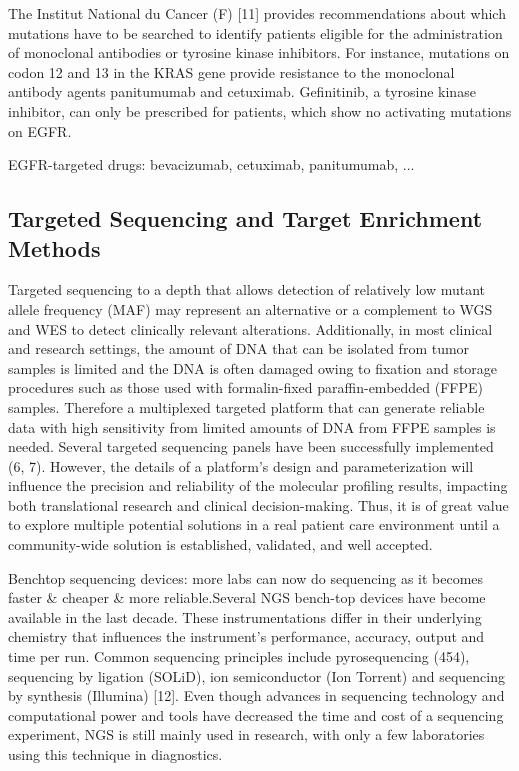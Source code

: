 The Institut National du Cancer (F) [11]
provides recommendations about which mutations have to be searched to identify
patients eligible for the administration of monoclonal antibodies or tyrosine
kinase inhibitors. For instance, mutations on codon 12 and 13 in the KRAS gene
provide resistance to the monoclonal antibody agents panitumumab and cetuximab.
Gefinitinib, a tyrosine kinase inhibitor, can only be prescribed for patients,
which show no activating mutations on EGFR.


EGFR-targeted drugs:
bevacizumab, cetuximab, panitumumab, ...

\subsection{Targeted Sequencing and Target Enrichment Methods}

Targeted sequencing to a depth that allows detection of relatively low mutant
allele frequency (MAF) may represent an alternative or a complement to WGS and
WES to detect clinically relevant alterations. Additionally, in most clinical
and research settings, the amount of DNA that can be isolated from tumor samples
is limited and the DNA is often damaged owing to fixation and storage procedures
such as those used with formalin-fixed paraffin-embedded (FFPE) samples.
Therefore a multiplexed targeted platform that can generate reliable data with
high sensitivity from limited amounts of DNA from FFPE samples is needed.
Several targeted sequencing panels have been successfully implemented (6, 7).
However, the details of a platform's design and parameterization will influence
the precision and reliability of the molecular profiling results, impacting both
translational research and clinical decision-making. Thus, it is of great value
to explore multiple potential solutions in a real patient care environment until
a community-wide solution is established, validated, and well accepted.

Benchtop sequencing devices: more labs can now do sequencing as it becomes
faster \& cheaper \& more reliable.Several NGS bench-top devices have become
available in the last decade. These instrumentations differ in their underlying
chemistry that influences the instrument’s performance, accuracy, output and
time per run. Common sequencing principles include pyrosequencing (454),
sequencing by ligation (SOLiD), ion semiconductor (Ion Torrent) and sequencing
by synthesis (Illumina) [12]. Even though advances in sequencing technology and
computational power and tools have decreased the time and cost of a sequencing
experiment, NGS is still mainly used in research, with only a few laboratories
using this technique in diagnostics.

